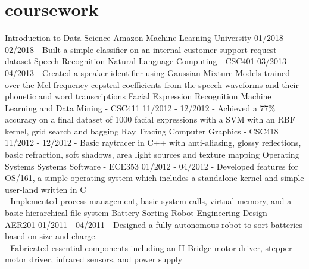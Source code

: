 \documentclass[]{friggeri-cv}
\begin{document}
\section{coursework}

\begin{entrylist}
  \entry
    {Introduction to Data Science}
    {Amazon Machine Learning University}
    {01/2018 - 02/2018}
    {- Built a simple classifier on an internal customer support request dataset}
  \entry
    {Speech Recognition}
    {Natural Language Computing - CSC401}
    {03/2013 - 04/2013}
    {- Created a speaker identifier using Gaussian Mixture Models trained over the Mel-frequency cepstral coefficients from the speech waveforms  and their phonetic and word transcriptions}
  \entry
    {Facial Expression Recognition}
    {Machine Learning and Data Mining - CSC411}
    {11/2012 - 12/2012}
    {- Achieved a 77\% accuracy on a final dataset of 1000 facial expressions with a SVM with an RBF kernel, grid search and bagging}
  \entry
    {Ray Tracing}
    {Computer Graphics - CSC418}
    {11/2012 - 12/2012}
    {- Basic raytracer in C++ with anti-aliasing, glossy reflections, basic refraction, soft shadows, area light sources and texture mapping}
 \entry
    {Operating Systems}
    {Systems Software - ECE353}
    {01/2012 - 04/2012}
    {- Developed  features  for OS/161, a simple operating  system  which includes a standalone kernel and simple user-land  written in C\\
    - Implemented process management, basic system  calls, virtual memory, and a basic hierarchical file system}
 \entry
    {Battery Sorting Robot}
    {Engineering Design - AER201}
    {01/2011 - 04/2011}
    {- Designed a fully autonomous robot to sort batteries based on size and charge.\\
    - Fabricated  essential components including an H-Bridge motor driver, stepper motor driver, infrared sensors, and power supply}
\end{entrylist}
\end{document}
